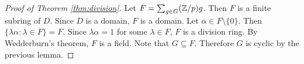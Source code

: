 \begin{proof}[Proof of Theorem \ref{thm:division}]
    Let $F=\sum_{g\in G}(\mathbb{Z}/p)g$. Then $F$ is a finite 
    subring of $D$. Since $D$ is a domain, $F$ is a domain. 
    Let $\alpha\in F\setminus\{0\}$. 
    Then 
    $\{\lambda\alpha:\lambda\in F\}=F$. Since $\lambda\alpha=1$
    for some $\lambda\in F$, $F$ is a division ring. By Wedderburn's 
    theorem, $F$ is a field. Note that $G\subseteq F$. 
    Therefore $G$ is cyclic by the previous lemma. 
\end{proof}






